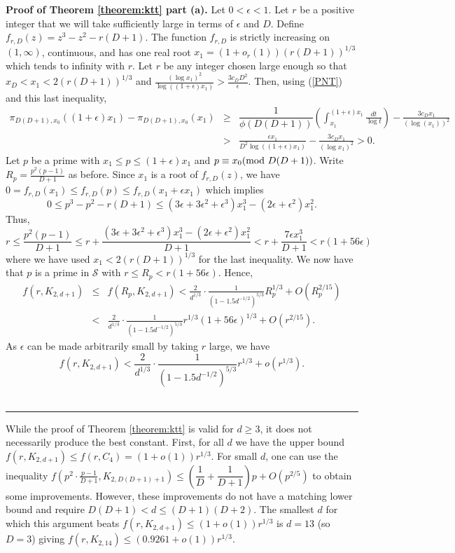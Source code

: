 \documentclass[12pt]{article}%
\newenvironment{proof}[1][Proof]{\noindent\textbf{#1.} }
{\hfill \ \rule{0.5em}{0.5em}}
\begin{document}
\begin{proof}[Proof of Theorem \ref{theorem:ktt} part (a)]
Let $0 < \epsilon < 1$.  Let $r$ be a positive integer that we will take sufficiently large in terms of $\epsilon$ and $D$.  Define $f_{r,D}(z) = z^3 - z^2 - r(D+1)$.  
The function $f_{r,D}$ is strictly increasing on $(1, \infty)$, continuous, and has one real root $x_1 = (1 + o_r(1))(r(D+1))^{1/3}$ which tends to infinity with $r$.    
Let $r$ be any integer chosen large enough so that $x_D < x_1 < 2 ( r ( D + 1))^{1/3}$ and 
$\frac{ ( \log x_1 )^2 }{ \log ((1 + \epsilon ) x_1 ) } >
\frac{ 3 c_D D^2 }{ \epsilon}$.
  Then, using (\ref{PNT}) and this last inequality,  
\begin{eqnarray*}
    \pi_{D(D+1) , x_0 } ( ( 1 + \epsilon )x_1 ) - 
    \pi_{D(D+1) , x_0 } ( x_1)  
    & \geq & \dfrac{1}{ \phi (D(D+1)) } \left(
    \int_{x_1}^{ (1 + \epsilon )x_1 } \frac{dt}{ \log t} \right) 
    - \frac{3 c_D x_1}{ ( \log (x_1) )^2 } \\
    & > & 
    \frac{ \epsilon x_1 }{ D^2  \log ((1 + \epsilon) x_1) } 
    - \frac{3c_D x_1}{  ( \log x_1)^2 } > 0.
 \end{eqnarray*}
Let $p$ be a prime with $x_1 \leq p \leq ( 1 + \epsilon )x_1$
and $p \equiv x_0 ( \textup{mod}~D(D+1) )$.  Write $R_p = \frac{p^2(p-1)}{D+1}$ as before.  Since $x_1$ is a root of $f_{r,D}(z)$, we have 
$0 = f_{r,D}(x_1) \leq f_{r,D}(p) \leq f_{r,D}(x_1 + \epsilon x_1)$ which implies 
\[
0 \leq p^3 - p^2 - r (D+1) \leq (3\epsilon+3\epsilon^2+\epsilon^3)x_1^3 - (2\epsilon+\epsilon^2)x_1^2.   
\]
Thus, 
\[
r \leq \frac{ p^2 ( p - 1) }{ D + 1}  
\leq r + \frac{  (3\epsilon+3\epsilon^2+\epsilon^3)x_1^3 - (2\epsilon+\epsilon^2)x_1^2   }{D+1} 
< r + \frac{ 7 \epsilon x_1^3 }{D+1} < r ( 1 + 56 \epsilon)
\]
where we have used $x_1 < 2 ( r (D+1))^{1/3}$ for the last inequality.  We now have that $p$ is a prime in $\mathcal{S}$ with 
$r \leq R_p < r ( 1+ 56 \epsilon)$.  Hence,
\begin{eqnarray*}
    f(r,K_{2,d+1})  & \leq &  f(R_p , K_{2,d+1}) 
< 
\frac{ 2  } { d^{1/3}} \cdot \frac{ 1}{ ( 1 - 1.5d^{-1/2} )^{5/3} }    R_p^{1/3} + O(R_p^{2/15}) \\
& < & 
\frac{ 2  } { d^{1/3}} \cdot \frac{ 1}{ ( 1 - 1.5d^{-1/2} )^{5/3} } r^{1/3} ( 1 + 56 \epsilon)^{1/3} + O (r^{2/15}).
\end{eqnarray*}
As $\epsilon$ can be made arbitrarily small by taking $r$ large, we have 
\[
f(r , K_{2,d+1}) < \frac{2}{d^{1/3}} \cdot 
\frac{1}{  (1 - 1.5 d^{-1/2} )^{5/3} } r^{1/3} + o (r^{1/3}).
\]
\end{proof}

While the proof of Theorem \ref{theorem:ktt} is valid for $d \geq 3$, it does not necessarily produce the best constant.  First, for all $d$ we have the upper bound 
$f(r,K_{2,d+1} ) \leq f(r,C_4) = (1 + o(1))r^{1/3}$.  
For small $d$, one can use the inequality $f\left( p^2 \cdot \frac{ p-1}{ D+1}  , K_{2,D(D+1)+1} \right) 
\leq \left( \dfrac{1}{ D} + \dfrac{1}{D+1} \right)
p + O( p^{2/5} )$ to obtain some improvements.  However, these improvements do not have a matching lower bound and require $D(D+1) < d \leq (D+1)(D+2)$.  The smallest $d$ for which this argument beats $f(r, K_{2,d+1}) \leq (1+ o(1))r^{1/3}$ is $d = 13$ (so $D = 3$) giving
$f(r,K_{2,14}) \leq ( 0.9261 + o(1))r^{1/3}$.  
\end{document}
